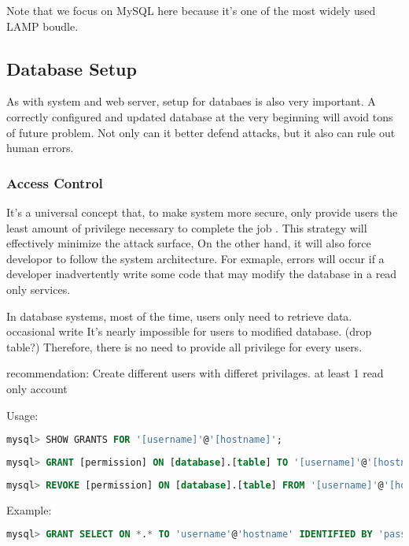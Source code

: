 \documentclass[conference]{IEEEtran}
\begin{document}
Note that we focus on MySQL here because it's one of
the most widely used LAMP \cite{LAMP} boudle.

\subsection{Database Setup}
As with system and web server, setup for databaes is also very important.
A correctly configured and updated database at the very beginning will
avoid tons of future problem.
Not only can it better defend attacks, but it also can rule out human errors.

\subsubsection{Access Control}
It's a universal concept that, to make system more secure, only provide users
the least amount of privilege necessary to complete the job \cite{least_privilege}.
This strategy will effectively minimize the attack surface,
On the other hand, it will also force developor to follow the system architecture.
For exmaple, errors will occur if a developer inadvertently write some code
that may modify the database
in a read only services.

In database systems,
most of the time, users only need to retrieve data.
occasional write
It's nearly impossible for users to modified database. (drop table?)
Therefore, there is no need to provide all privilege
for every users.

recommendation:
Create different users with differet privilages.
at least 1 read only account

Usage:
\begin{lstlisting}[language=sql]
mysql> SHOW GRANTS FOR '[username]'@'[hostname]';
\end{lstlisting}
\begin{lstlisting}[language=sql]
mysql> GRANT [permission] ON [database].[table] TO '[username]'@'[hostname]' IDENTIFIED BY '[password]';
\end{lstlisting}
\begin{lstlisting}[language=sql]
mysql> REVOKE [permission] ON [database].[table] FROM '[username]'@'[hostname]';
\end{lstlisting}

Example:
\begin{lstlisting}[language=sql]
mysql> GRANT SELECT ON *.* TO 'username'@'hostname' IDENTIFIED BY 'password';
\end{lstlisting}
\end{document}
